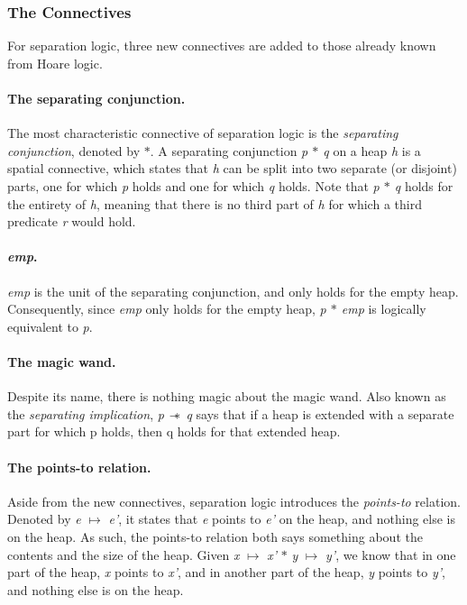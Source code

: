 \subsubsection{The Connectives}
For separation logic, three new connectives are added to those already known from Hoare logic. 
\paragraph{The separating conjunction.}
The most characteristic connective of separation logic is the {\it separating conjunction}, denoted by {\it $\ast$}. A separating conjunction {\it p $\ast$ q} on a heap {\it h} is a spatial connective, which states that {\it h} can be split into two separate (or disjoint) parts, one for which {\it p} holds and one for which {\it q} holds. Note that {\it p $\ast$ q} holds for the entirety of {\it h}, meaning that there is no third part of {\it h} for which a third predicate {\it r} would hold.

\paragraph{{\it emp}.}
{\it emp} is the unit of the separating conjunction, and only holds for the empty heap. Consequently, since {\it emp} only holds for the empty heap, {\it p $\ast$ emp} is logically equivalent to {\it p}.

\paragraph{The magic wand.}
Despite its name, there is nothing magic about the magic wand. Also known as the {\it separating implication}, {\it p $\wand$ q} says that if a heap is extended with a separate part for which p holds, then q holds for that extended heap.

\paragraph{The points-to relation.}
Aside from the new connectives, separation logic introduces the {\it points-to} relation. Denoted by {\it e} $\mapsto$ {\it e'}, it states that {\it e} points to {\it e'} on the heap, and nothing else is on the heap. As such, the points-to relation both says something about the contents and the size of the heap. Given {\it x} $\mapsto$ {\it x'} $\ast$ {\it y} $\mapsto$ {\it y'}, we know that in one part of the heap, {\it x} points to {\it x'}, and in another part of the heap, {\it y} points to {\it y'}, and nothing else is on the heap.


